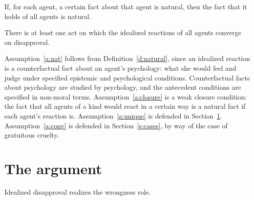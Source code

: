 \documentclass{situationist-preprint}
\begin{document}
\begin{assumption}[Closure]\label{a:closure}
If, for each agent, a certain fact about that agent is natural, then the fact that it holds of all agents is natural.
\end{assumption}

\begin{assumption}\label{a:conv}
There is at least one act on which the idealized reactions of all agents converge on disapproval.
\end{assumption}

Assumption~\ref{a:nat} follows from Definition~\ref{d:natural}, since an idealized reaction is a counterfactual fact about an agent's psychology: what she would feel and judge under specified epistemic and psychological conditions. Counterfactual facts about psychology are studied by psychology, and the antecedent conditions are specified in non-moral terms. Assumption~\ref{a:closure} is a weak closure condition: the fact that all agents of a kind would react in a certain way is a natural fact if each agent's reaction is. Assumption~\ref{a:unique} is defended in Section~\ref{s:arg}. Assumption~\ref{a:conv} is defended in Section~\ref{s:cases}, by way of the case of gratuitous cruelty.

\section{The argument}\label{s:arg}

\begin{lemma}\label{l:realize}
Idealized disapproval realizes the wrongness role.
\end{lemma}
\end{document}
